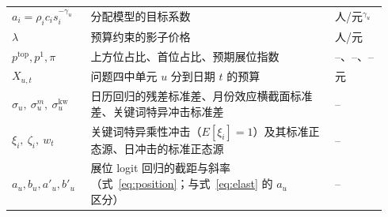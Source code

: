 \begin{longtable}{@{}p{0.2\linewidth}p{0.62\linewidth}p{0.12\linewidth}@{}}
$a_i=\rho_i c_i s_i^{-\gamma_u}$ & 分配模型的目标系数 & 人/元$^{\gamma_u}$ \\
$\lambda$ & 预算约束的影子价格 & 人/元 \\
$p^{\mathrm{top}},p^{1},\pi$ & 上方位占比、首位占比、预期展位指数 & --、--、-- \\
$X_{u,t}$ & 问题四中单元 $u$ 分到日期 $t$ 的预算 & 元 \\
$\sigma_u,\ \sigma^{m}_u,\ \sigma^{\mathrm{kw}}_u$ & 日历回归的残差标准差、月份效应横截面标准差、关键词特异冲击标准差 & -- \\
$\xi_i,\ \zeta_i,\ w_t$ & 关键词特异乘性冲击（$E[\xi_i]=1$）及其标准正态源、日冲击的标准正态源 & -- \\
$a_u,b_u,a'_u,b'_u$ & 展位 logit 回归的截距与斜率（式~\eqref{eq:position}；与式~\eqref{eq:elast} 的 $a_u$ 区分） & -- \\
\end{longtable}
